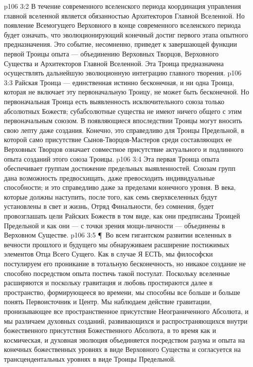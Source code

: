 \vs p106 3:2 В течение современного вселенского периода координация управления главной вселенной является обязанностью Архитекторов Главной Вселенной. Но появление Всемогущего Верховного в конце современного вселенского периода будет означать, что эволюционирующий конечный достиг первого этапа опытного предназначения. Это событие, несомненно, приведет к завершающей функции первой Троицы опыта --- объединению Верховных Творцов, Верховного Существа и Архитекторов Главной Вселенной. Эта Троица предназначена осуществлять дальнейшую эволюционную интеграцию главного творения.
\vs p106 3:3 Райская Троица --- единственная истинно бесконечная, и ни одна Троица, которая не включает эту первоначальную Троицу, не может быть бесконечной. Но первоначальная Троица есть выявленность исключительного союза только абсолютных Божеств; субабсолютные существа не имеют ничего общего с этим первоначальным союзом. В появляющиеся впоследствии Троицы могут вносить свою лепту даже создания. Конечно, это справедливо для Троицы Предельной, в которой само присутствие Сынов\hyp{}Творцов\hyp{}Мастеров среди составляющих ее Верховных Творцов означает совместное присутствие актуального и подлинного опыта созданий  этого союза Троицы.
\vs p106 3:4 Эта первая Троица опыта обеспечивает группам достижение предельных выявленностей. Союзам групп дана возможность предвосхищать, даже превосходить индивидуальные способности; и это справедливо даже за пределами конечного уровня. В века, которые должны наступить, после того, как семь сверхвселенных будут установлены в свет и жизнь, Отряд Финальности, без сомнения, будет провозглашать цели Райских Божеств в том виде, как они предписаны Троицей Предельной и как они --- с точки зрения мощи\hyp{}личности --- объединены в Верховном Существе.
\vs p106 3:5 \P\ Во всем гигантском развитии вселенных в вечности прошлого и будущего мы обнаруживаем расширение постижимых элементов Отца Всего Сущего. Как в случае Я ЕСТЬ, мы философски постулируем его проникание в тотальную бесконечность, но никакое создание не способно посредством опыта постичь такой постулат. Поскольку вселенные расширяются и поскольку гравитация и любовь простираются далее в пространство, формирующееся во времени, мы способны все больше и больше понять Первоисточник и Центр. Мы наблюдаем действие гравитации, пронизывающее все пространственное присутствие Неограниченного Абсолюта, и мы различаем духовных созданий, развивающихся и распространяющихся внутри божественного присутствия Божественного Абсолюта, в то время как и космическая, и духовная эволюция объединяется посредством разума и опыта на конечных божественных уровнях в виде Верховного Существа и согласуется на трансцендентальных уровнях в виде Троицы Предельной.
